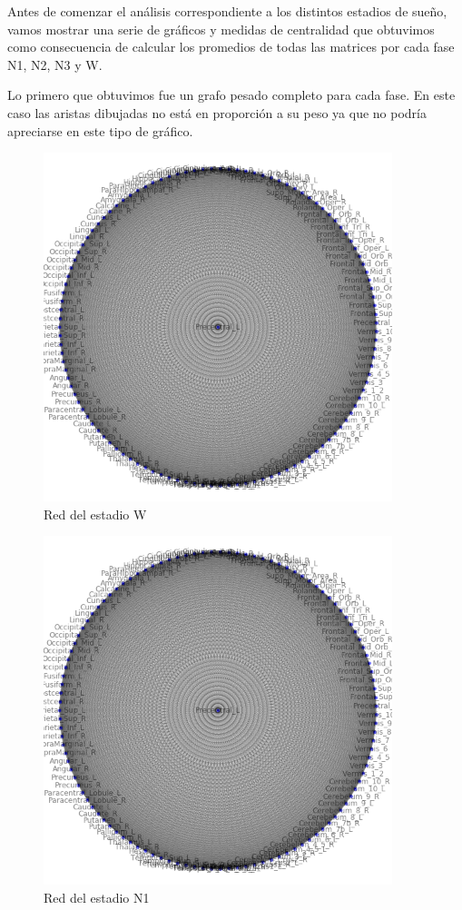 
Antes de comenzar el análisis correspondiente a los distintos estadios de sueño, vamos mostrar una serie de gráficos y medidas de centralidad que obtuvimos como consecuencia de calcular los promedios de todas las matrices por cada fase N1, N2, N3 y W.

Lo primero que obtuvimos fue un grafo pesado completo para cada fase. En este caso las aristas dibujadas no está en proporción a su peso ya que no podría apreciarse en este tipo de gráfico.

\begin{figure}[H]
    \centering
    \includegraphics[width = 4in]{img/avg_w.png}
    \caption{Red del estadio W}
    \label{fig:avg-w}
\end{figure}

\begin{figure}[H]
    \centering
    \includegraphics[width = 4in]{img/avg_n1.png}
    \caption{Red del estadio N1}
    \label{fig:avg-n1}
\end{figure}

